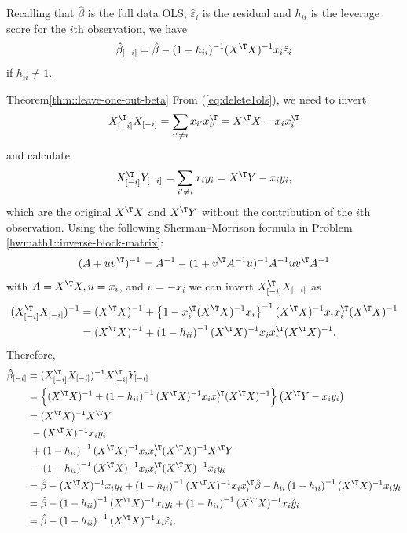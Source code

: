 \begin{theorem}\label{thm::leave-one-out-beta}
Recalling that $\hat{\beta}$ is the full data OLS, $\hat{\varepsilon}_{i}$
is the residual and $h_{ii}$ is the leverage score for the $i$th
observation, we have
\[
\hat{\beta}_{[-i]}=\hat{\beta}-(1-h_{ii})^{-1}(X^{\T}X)^{-1}x_{i}\hat{\varepsilon}_{i}
\]
if $h_{ii} \neq 1$. 
\end{theorem}
%


\begin{myproof}{Theorem}{\ref{thm::leave-one-out-beta}}
From (\ref{eq:delete1ols}), we need to invert 
\[
X_{[-i]}^{\T}X_{[-i]}=\sum_{i'\neq i}x_{i'}x_{i'}^{\T}=X^{\T}X-x_{i}x_{i}^{\T}
\]
 and calculate 
\[
X_{[-i]}^{\T}Y_{[-i]}=\sum_{i'\neq i}x_{i}y_{i}=X^{\T}Y-x_{i}y_{i},
\]
which are the original $X^{\T}X$ and $X^{\T}Y$ without the contribution of the $i$th observation. 
Using the following Sherman--Morrison formula in Problem \ref{hwmath1::inverse-block-matrix}:
\[
(A+uv^{\T})^{-1}=A^{-1}-(1+v^{\T}A^{-1}u)^{-1}A^{-1}uv^{\T}A^{-1}
\]
with $A=X^{\T}X,u=x_i$, and $v=-x_{i}$ we can invert $X_{[-i]}^{\T}X_{[-i]}$
as
\begin{align*}
(X_{[-i]}^{\T}X_{[-i]})^{-1} & =(X^{\T}X)^{-1}+\left\{ 1-x_{i}^{\T}(X^{\T}X)^{-1}x_{i}\right\} ^{-1}(X^{\T}X)^{-1}x_{i}x_{i}^{\T}(X^{\T}X)^{-1}\\
 & =(X^{\T}X)^{-1}+\left(1-h_{ii}\right)^{-1}(X^{\T}X)^{-1}x_{i}x_{i}^{\T}(X^{\T}X)^{-1}.
\end{align*}
Therefore, 
\begin{align*}
\hat{\beta}_{[-i]} & =(X_{[-i]}^{\T}X_{[-i]})^{-1}X_{[-i]}^{\T}Y_{[-i]}\\
 & =\left\{ (X^{\T}X)^{-1}+\left(1-h_{ii}\right)^{-1}(X^{\T}X)^{-1}x_{i}x_{i}^{\T}(X^{\T}X)^{-1}\right\} \left(X^{\T}Y-x_{i}y_{i}\right)\\
 & =(X^{\T}X)^{-1}X^{\T}Y \\
 &\  -(X^{\T}X)^{-1}x_{i}y_{i}\\
 & \ +\left(1-h_{ii}\right)^{-1}(X^{\T}X)^{-1}x_{i}x_{i}^{\T}(X^{\T}X)^{-1}X^{\T}Y \\
 &\ -\left(1-h_{ii}\right)^{-1}(X^{\T}X)^{-1}x_{i}x_{i}^{\T}(X^{\T}X)^{-1}x_{i}y_{i}\\
 & =\hat{\beta}-(X^{\T}X)^{-1}x_{i}y_{i}+\left(1-h_{ii}\right)^{-1}(X^{\T}X)^{-1}x_{i}x_{i}^{\T}\hat{\beta}-h_{ii}\left(1-h_{ii}\right)^{-1}(X^{\T}X)^{-1}x_{i}y_{i}\\
 & =\hat{\beta}-\left(1-h_{ii}\right)^{-1}(X^{\T}X)^{-1}x_{i}y_{i}+\left(1-h_{ii}\right)^{-1}(X^{\T}X)^{-1}x_{i}\hat{y}_{i}\\
 & =\hat{\beta}-\left(1-h_{ii}\right)^{-1}(X^{\T}X)^{-1}x_{i}\hat{\varepsilon}_{i}.
\end{align*}
\end{myproof}



